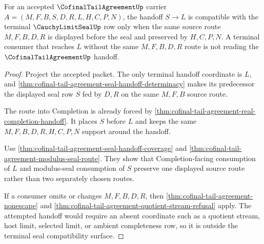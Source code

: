 \begin{theorem}
\label{thm:cofinal-tail-agreement-terminal-seal-compatibility}
For an accepted $\CofinalTailAgreementUp$ carrier $A=(M,F,B,S,D,R,L,H,C,P,N)$, the handoff $S\to L$ is compatible with the terminal $\CauchyLimitSealUp$ row only when the same source route $M,F,B,D,R$ is displayed before the seal and preserved by $H,C,P,N$. A terminal consumer that reaches $L$ without the same $M,F,B,D,R$ route is not reading the $\CofinalTailAgreementUp$ handoff.
\end{theorem}
\begin{proof}
Project the accepted packet. The only terminal handoff coordinate is $L$, and \autoref{thm:cofinal-tail-agreement-seal-handoff-determinacy} makes its predecessor the displayed seal row $S$ fed by $D,R$ on the same $M,F,B$ source route.

The route into Completion is already forced by \autoref{thm:cofinal-tail-agreement-real-completion-handoff}. It places $S$ before $L$ and keeps the same $M,F,B,D,R,H,C,P,N$ support around the handoff.

Use \autoref{thm:cofinal-tail-agreement-seal-handoff-coverage} and \autoref{thm:cofinal-tail-agreement-modulus-seal-route}. They show that Completion-facing consumption of $L$ and modulus-seal consumption of $S$ preserve one displayed source route rather than two separately chosen routes.

If a consumer omits or changes $M,F,B,D,R$, then \autoref{thm:cofinal-tail-agreement-nonescape} and \autoref{thm:cofinal-tail-agreement-quotient-stream-refusal} apply. The attempted handoff would require an absent coordinate such as a quotient stream, host limit, selected limit, or ambient completeness row, so it is outside the terminal seal compatibility surface.
\end{proof}

